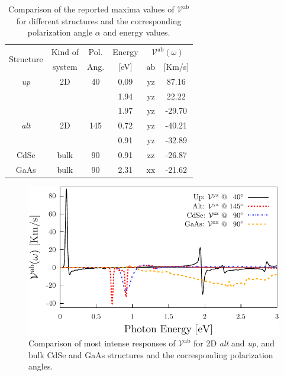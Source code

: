 \documentclass[prb,11pt,tightenlines,twocolumn,aps]{revtex4-1}
\begin{document}
\begin{table}[b]
\begin{tabular}{cccccc}
\hline
\multirow{2}{*}{Structure \quad} & 
Kind of \quad & 
Pol. &
Energy & 
\multicolumn{2}{c}{$\mathcal{V}^{\mathrm{ab}}(\omega)$}\\
\cline{5-6}
& system & Ang. & [eV] & $\mathrm{ab}$ \quad & [Km/s]\\
\hline
\emph{up}    & 2D   & 40    & 0.09  & $\mathrm{yz}$ &  87.16    \\
             &      &       & 1.94  & $\mathrm{yz}$ &  22.22    \\
             &      &       & 1.97  & $\mathrm{yz}$ & -29.70    \\
\emph{alt}   & 2D   & 145   & 0.72  & $\mathrm{yz}$ & -40.21    \\
             &      &       & 0.91  & $\mathrm{yz}$ & -32.89    \\
 CdSe        & bulk & 90    & 0.91  & $\mathrm{zz}$ & -26.87    \\
 GaAs        & bulk & 90    & 2.31  & $\mathrm{xx}$ & -21.62    \\
\hline
\end{tabular}

\caption{Comparison of the reported maxima values of
$\mathcal{V}^{\mathrm{ab}}$ for different structures and the corresponding
polarization angle $\alpha$ and energy values.}
\label{tab:vab-str-comp}
\end{table}

\begin{figure}[t]
    \centering
    \includegraphics[width=\linewidth]{plots/vab-str-comp}
    
    \caption{Comparison of most intense responses of $\mathcal{V}^{\mathrm{ab}}$
    for 2D \emph{alt} and \emph{up}, and bulk CdSe and GaAs structures and the
    corresponding polarization angles.}
    \label{fig:vab-str-comp}
\end{figure}
\end{document}

